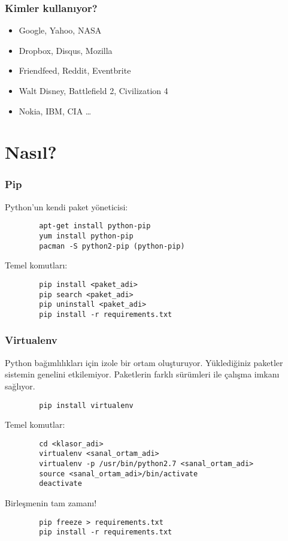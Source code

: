 \documentclass[10pt, compress]{beamer}
\begin{document}
\begin{frame}[fragile]
    \frametitle{Kimler kullanıyor?}
    \begin{itemize}[<+- | alert@+>]
        \item Google, Yahoo, NASA
        \item Dropbox, Disqus, Mozilla
        \item Friendfeed, Reddit, Eventbrite
        \item Walt Disney, Battlefield 2, Civilization 4
        \item Nokia, IBM, CIA \ldots  
    \end{itemize}  
\end{frame}

\section{Nasıl?}

\begin{frame}[fragile]
\frametitle{Pip}
    Python'un kendi paket yöneticisi:
      \begin{verbatim}
        apt-get install python-pip
        yum install python-pip
        pacman -S python2-pip (python-pip)
      \end{verbatim}    
    Temel komutları:
    \begin{verbatim}
        pip install <paket_adi>
        pip search <paket_adi>
        pip uninstall <paket_adi>
        pip install -r requirements.txt
    \end{verbatim}       
\end{frame}

\begin{frame}[fragile]
\frametitle{Virtualenv}
    Python bağımlılıkları için izole bir ortam oluşturuyor. Yüklediğiniz paketler sistemin genelini etkilemiyor. Paketlerin farklı sürümleri ile çalışma imkanı sağlıyor.
    \begin{verbatim}
        pip install virtualenv
    \end{verbatim}  
    Temel komutlar:
    \begin{verbatim}
        cd <klasor_adi>
        virtualenv <sanal_ortam_adi>
        virtualenv -p /usr/bin/python2.7 <sanal_ortam_adi>
        source <sanal_ortam_adi>/bin/activate
        deactivate
    \end{verbatim}    
    Birleşmenin tam zamanı!
    \begin{verbatim}
        pip freeze > requirements.txt
        pip install -r requirements.txt
    \end{verbatim}       
\end{frame}
\end{document}
